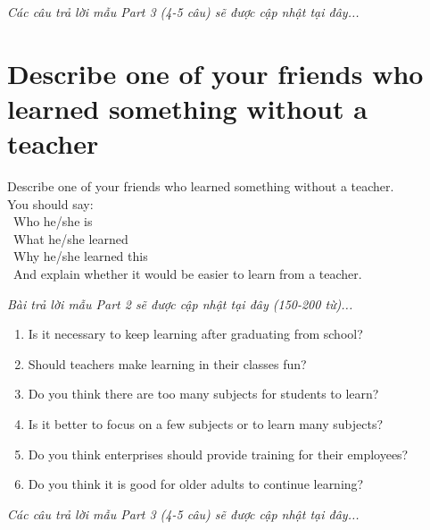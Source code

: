 \vspace{1em}
\textit{Các câu trả lời mẫu Part 3 (4-5 câu) sẽ được cập nhật tại đây...}
\vspace{2em}

\section{Describe one of your friends who learned something without a teacher}
\begin{ieltsprompt}
Describe one of your friends who learned something without a teacher. \\
You should say: \\
\textbullet\ Who he/she is \\
\textbullet\ What he/she learned \\
\textbullet\ Why he/she learned this \\
\textbullet\ And explain whether it would be easier to learn from a teacher. \\
\end{ieltsprompt}

\vspace{1em}
\textit{Bài trả lời mẫu Part 2 sẽ được cập nhật tại đây (150-200 từ)...}
\vspace{2em}

\begin{ieltsprompt}
\begin{enumerate}[itemsep=4pt]
    \item Is it necessary to keep learning after graduating from school?
    \item Should teachers make learning in their classes fun?
    \item Do you think there are too many subjects for students to learn?
    \item Is it better to focus on a few subjects or to learn many subjects?
    \item Do you think enterprises should provide training for their employees?
    \item Do you think it is good for older adults to continue learning?
\end{enumerate}
\end{ieltsprompt}

\vspace{1em}
\textit{Các câu trả lời mẫu Part 3 (4-5 câu) sẽ được cập nhật tại đây...}
\vspace{2em}

